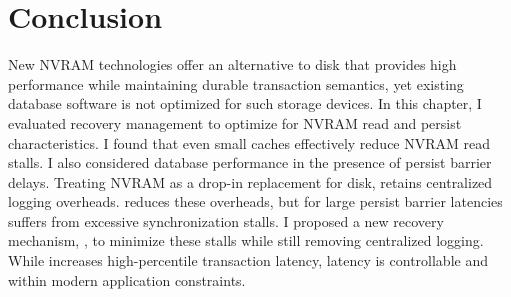 \section{Conclusion}
\label{sec:OLTP_eval:Conclusion}
New NVRAM technologies offer an alternative to disk that provides high performance while maintaining durable transaction semantics, yet existing database software is not optimized for such storage devices.
In this chapter, I evaluated recovery management to optimize for NVRAM read and persist characteristics.
I found that even small caches effectively reduce NVRAM read stalls.
I also considered database performance in the presence of persist barrier delays.
Treating NVRAM as a drop-in replacement for disk, \NVDisk retains centralized logging overheads.
\InPlace reduces these overheads, but for large persist barrier latencies suffers from excessive synchronization stalls.
I proposed a new recovery mechanism, \GroupCommit, to minimize these stalls while still removing centralized logging.
While \GroupCommit increases high-percentile transaction latency, latency is controllable and within modern application constraints.
